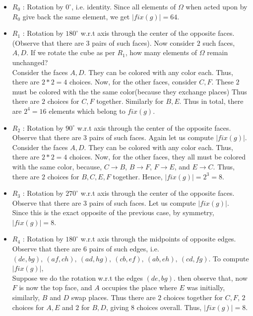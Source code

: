 \begin{itemize}
\item $R_0$ : Rotation by $0^{\circ}$, i.e. identity. Since all elements of $\Omega$ when acted upon by $R_0$ give back the same element, we get $|fix(g)| = 64$.

\item $R_1$ : Rotation by $180^{\circ}$ w.r.t axis through the center of the opposite faces. (Observe that there are $3$ pairs of such faces). Now consider $2$ such faces, $A, D$. If we rotate the cube as per $R_1$, how many elements of $\Omega$ remain unchanged? 
\\
Consider the faces $A, D$. They can be colored with any color each. Thus, there are $2*2 = 4$ choices. Now, for the other faces, consider $C, F$. These $2$ must be colored with the the same color(because they exchange places) Thus there are $2$ choices for $C, F$ together. Similarly for $B, E$. Thus in total, there are $2^4 = 16$ elements which belong to $fix(g)$.

\item $R_2$ : Rotation by $90^{\circ}$ w.r.t axis through the center of the opposite faces. Observe that there are $3$ pairs of such faces. Again let us compute $|fix(g)|$.
\\
Consider the faces $A, D$. They can be colored with any color each. Thus, there are $2*2 = 4$ choices. Now, for the other faces, they all must be colored with the same color, because, $C \rightarrow B$, $B \rightarrow F$, $F \rightarrow E$, and $E \rightarrow C$. Thus, there are $2$ choices for $B, C, E, F$ together. Hence, $|fix(g)| = 2^3 = 8$.

\item $R_3$ : Rotation by $270^{\circ}$ w.r.t axis through the center of the opposite faces. Observe that there are $3$ pairs of such faces. Let us compute $|fix(g)|$.
\\
Since this is the exact opposite of the previous case, by symmetry, $|fix(g)| = 8$.

\item $R_4$ : Rotation by $180^{\circ}$ w.r.t axis through the midpoints of opposite edges. Observe that there are $6$ pairs of such edges, i.e. $(de, bg),\ (af, ch),\ (ad, hg),\ (cb, ef),\ (ab, eh),\ (cd, fg)$. To compute $|fix(g)|$, 
\\
Suppose we do the rotation w.r.t the edges $(de, bg)$. then observe that, now $F$ is now the top face, and $A$ occupies the place where $E$ was initially, similarly, $B$ and $D$ swap places. Thus there are $2$ choices together for $C, F$, $2$ choices for $A, E$ and $2$ for $B, D$, giving $8$ choices overall.
Thus, $|fix(g)| = 8$.


\end{itemize}

